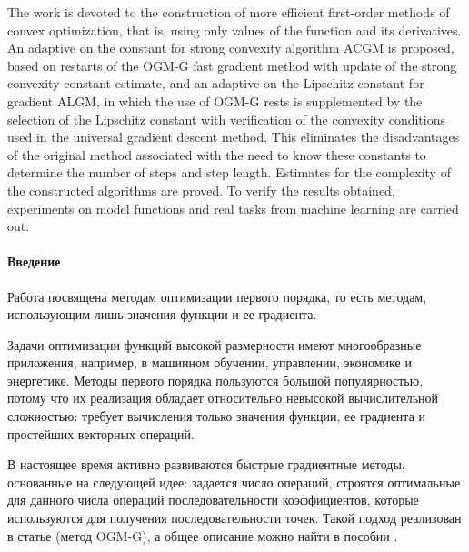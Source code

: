 \documentclass{crm-article}
\begin{document}
\begin{abstracteng}
The work is devoted to the construction of more efficient first-order methods of convex optimization, that is, using only values of the function and its derivatives. An adaptive on the constant for strong convexity algorithm ACGM is proposed, based on restarts of the OGM-G fast gradient method with update of the strong convexity constant estimate, and an adaptive on the Lipschitz constant for gradient ALGM, in which the use of OGM-G rests is supplemented by the selection of the Lipschitz constant with verification of the convexity conditions used in the universal gradient descent method. This eliminates the disadvantages of the original method associated with the need to know these constants to determine the number of steps and step length. Estimates for the complexity of the constructed algorithms are proved. To verify the results obtained, experiments on model functions and real tasks from machine learning are carried out.

\end{abstracteng}

\maketitle

\paragraph{Введение}
Работа посвящена методам оптимизации первого порядка, то есть методам, использующим лишь значения функции и ее градиента.

Задачи оптимизации функций высокой размерности имеют многообразные приложения, например, в машинном обучении, управлении, экономике и энергетике. Методы первого порядка пользуются большой популярностью, потому что их реализация обладает относительно невысокой вычислительной сложностью: требует вычисления только значения функции, ее градиента и простейших векторных операций.

В настоящее время активно развиваются быстрые градиентные методы, основанные на следующей идее: задается число операций, строятся оптимальные для данного числа операций последовательности коэффициентов, которые используются для получения последовательности точек. Такой подход реализован в статье \cite{kim2018fessler} (метод OGM-G), а общее описание можно найти в пособии \cite{gasnikov2017universal}.
\end{document}
